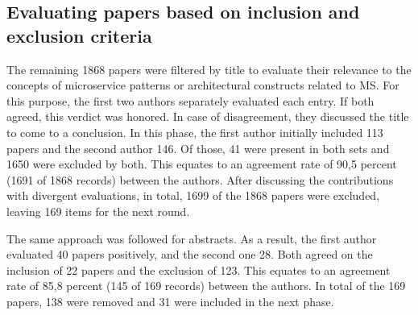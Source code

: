 \documentclass[a4paper,11pt,article,oneside]{memoir}
\begin{document}
\subsection{Evaluating papers based on inclusion and exclusion criteria}

The remaining 1868 papers were filtered by title to evaluate their relevance to the concepts of microservice patterns or architectural constructs related to MS. For this purpose, the first two authors separately evaluated each entry. If both agreed, this verdict was honored. In case of disagreement, they discussed the title to come to a conclusion. In this phase, the first author initially included 113 papers and the second author 146. Of those, 41 were present in both sets and 1650 were excluded by both. This equates to an agreement rate of 90,5 percent (1691 of 1868 records) between the authors. After discussing the contributions with divergent evaluations, in total, 1699 of the 1868 papers were excluded, leaving 169 items for the next round. 

The same approach was followed for abstracts. As a result, the first author evaluated 40 papers positively, and the second one 28. Both agreed on the inclusion of 22 papers and the exclusion of 123. This equates to an agreement rate of 85,8 percent (145 of 169 records) between the authors. In total of the 169 papers, 138 were removed and 31 were included in the next phase.







\end{document}
